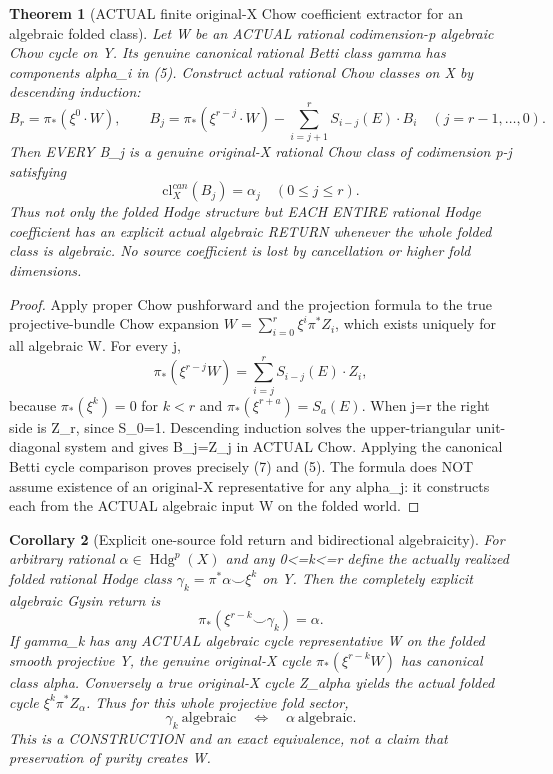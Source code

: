 \documentclass[11pt]{article}
\newtheorem{theorem}{Theorem}[section]
\newtheorem{corollary}[theorem]{Corollary}
\begin{document}
\begin{theorem}[ACTUAL finite original-X Chow coefficient extractor for an algebraic folded class]
Let W be an ACTUAL rational codimension-p algebraic
Chow cycle on Y. Its genuine canonical rational
Betti class gamma has components alpha_i in (5).
Construct actual rational Chow classes on X by
descending induction:
\[
 \boxed{
 B_r=\pi_*(\xi^{0}\cdot W),\qquad
 B_j=\pi_*(\xi^{r-j}\cdot W)
       -\sum_{i=j+1}^r S_{i-j}(E)\cdot B_i
       \quad(j=r-1,\dots,0).
 }                                                     \tag{6}
\]
Then EVERY B_j is a genuine original-X rational
Chow class of codimension p-j satisfying
\[
 \boxed{\mathrm{cl}^{can}_X(B_j)=\alpha_j
                    \quad(0\le j\le r).}         \tag{7}
\]
Thus not only the folded Hodge structure but
EACH ENTIRE rational Hodge coefficient has an
explicit actual algebraic RETURN whenever the
whole folded class is algebraic. No source
coefficient is lost by cancellation or higher
fold dimensions.
\end{theorem}
\begin{proof}
Apply proper Chow pushforward and the projection
formula to the true projective-bundle Chow
expansion $W=\sum_{i=0}^r \xi^i\pi^*Z_i$,
which exists uniquely for all algebraic W.
For every j,
\[
 \pi_*(\xi^{r-j}W)
 =\sum_{i=j}^r S_{i-j}(E)\cdot Z_i,
\]
because $\pi_*(\xi^k)=0$ for $k<r$ and
$\pi_*(\xi^{r+a})=S_a(E)$.
When j=r the right side is Z_r, since S_0=1.
Descending induction solves the upper-triangular
unit-diagonal system and gives B_j=Z_j
in ACTUAL Chow. Applying the canonical Betti
cycle comparison proves precisely (7) and (5).
The formula does NOT assume existence of an
original-X representative for any alpha_j:
it constructs each from the ACTUAL algebraic
input W on the folded world.
\end{proof}

\begin{corollary}[Explicit one-source fold return and bidirectional algebraicity]
For arbitrary rational $\alpha\in\operatorname{Hdg}^p(X)$
and any 0<=k<=r define the actually realized folded
rational Hodge class
$\gamma_k=\pi^*\alpha\smile\xi^k$ on Y.
Then the completely explicit algebraic Gysin return is
\[
 \boxed{\pi_*(\xi^{r-k}\smile\gamma_k)=\alpha.}
                                                               \tag{8}
\]
If gamma_k has any ACTUAL algebraic cycle representative W
on the folded smooth projective Y, the genuine original-X
cycle $\pi_*(\xi^{r-k} W)$ has canonical class alpha.
Conversely a true original-X cycle Z_alpha yields the
actual folded cycle $\xi^k\pi^*Z_\alpha$.
Thus for this whole projective fold sector,
\[
 \boxed{\gamma_k\ \text{algebraic}
    \quad\Longleftrightarrow\quad
       \alpha\ \text{algebraic}.}                \tag{9}
\]
This is a CONSTRUCTION and an exact equivalence,
not a claim that preservation of purity
creates W.
\end{corollary}
\end{document}
